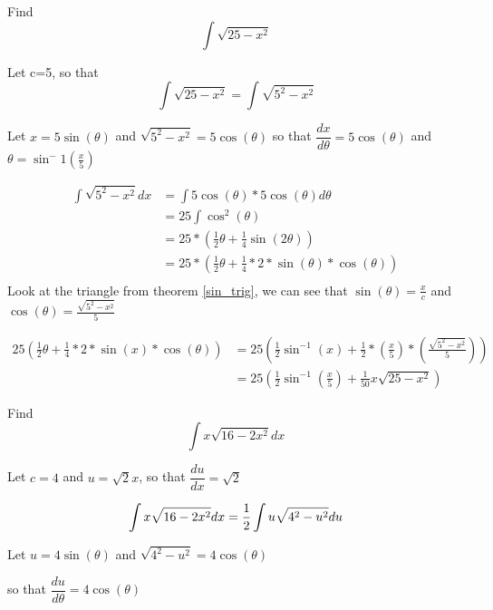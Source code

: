 \begin{center}
    	\begin{simple}{}{}
    	Find
    	$$\int\sqrt{25-x^2}$$
    	
    	Let c=5, so that 
    	$$\int\sqrt{25-x^2}=\int\sqrt{5^2-x^2}$$
    	
    	Let $x=5\sin{(\theta)}$ and $\sqrt{5^2-x^2}=5\cos{(\theta)}$
    	so that $\dfrac{dx}{d\theta}=5\cos{(\theta)}$
    	and $\theta=\sin^-1{(\frac{x}{5})}$
    	
    	\begin{align*}
    	    \int\sqrt{5^2-x^2}dx&=\int5\cos{(\theta)}*5\cos{(\theta)}d\theta\\
    	    &=25\int\cos^2{(\theta)}\\
    	    &=25*\left(\frac{1}{2}\theta+\frac{1}{4}\sin{(2\theta)}\right)\\
    	    &=25*\left(\frac{1}{2}\theta+\frac{1}{4}*2*\sin{(\theta)}*\cos{(\theta)}\right)\\
    	\end{align*}
    	Look at the triangle from theorem \ref{sin_trig}, we can see that $\sin{(\theta)}=\frac{x}{c}$ and $\cos{(\theta)}=\frac{\sqrt{5^2-x^2}}{5}$
    	
    	\begin{align*}
    	    25\left(\frac{1}{2}\theta+\frac{1}{4}*2*\sin{(x)}*\cos{(\theta)}\right)&=25\left(\frac{1}{2}\sin^{-1}{(x)}+\frac{1}{2}*\left(\frac{x}{5}\right)*\left(\frac{\sqrt{5^2-x^2}}{5}\right)\right)\\
    	    &=25\left(\frac{1}{2}\sin^{-1}{(\frac{x}{5})}+\frac{1}{50}x\sqrt{25-x^2}\right)
    	\end{align*}
    	
    	\end{simple}
    	
    	\begin{example}{}{}
    	Find
    	$$\int x\sqrt{16-2x^2}dx$$
    	
    	Let $c=4$ and $u=\sqrt{2}x$, so that $\dfrac{du}{dx}=\sqrt{2}$
    	
    	$$\int x\sqrt{16-2x^2}dx=\frac{1}{2}\int u\sqrt{4^2-u^2}du\\$$
    	
    	Let $u=4\sin{(\theta)}$ and $\sqrt{4^2-u^2}=4\cos{(\theta)}$
    	
    	so that $\dfrac{du}{d\theta}=4\cos{(\theta)}$
    	

\end{example}
\end{center}
